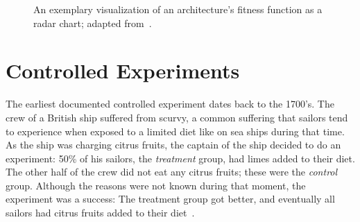 \begin{figure}[h]
        \caption{An exemplary visualization of an architecture's fitness function as a radar chart; adapted from~\cite{WEB:EvolArch:2016}.}
        \label{figure:fundamentals:evolutionary:fitness}
\end{figure}

\section{Controlled Experiments}
\label{sec:fundamentals:experiments}

The earliest documented controlled experiment dates back to the 1700's.
The crew of a British ship suffered from scurvy, a common suffering that sailors tend to experience when exposed to a limited diet like on sea ships during that time.
As the ship was charging citrus fruits, the captain of the ship decided to do an experiment: 50\% of his sailors, the \emph{treatment} group, had limes added to their diet.
The other half of the crew did not eat any citrus fruits; these were the \emph{control} group.
Although the reasons were not known during that moment, the experiment was a success: The treatment group got better, and eventually all sailors had citrus fruits added to their diet~\cite{rossi2003evaluation,marks2000progress}.

